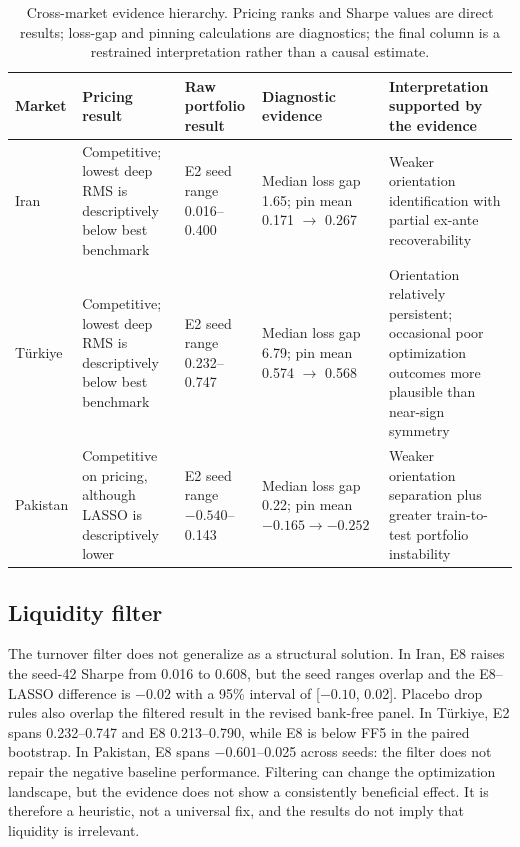\documentclass[12pt]{article}
\begin{document}
\begin{table}[htbp]
\centering
\caption{Cross-market evidence hierarchy. Pricing ranks and Sharpe values are direct results; loss-gap and pinning calculations are diagnostics; the final column is a restrained interpretation rather than a causal estimate.}
\label{tab:diagnosis}
\scriptsize
\setlength{\tabcolsep}{2pt}
\begin{tabular}{>{\raggedright\arraybackslash}p{1.4cm}>{\raggedright\arraybackslash}p{2.7cm}>{\raggedright\arraybackslash}p{2.3cm}>{\raggedright\arraybackslash}p{2.6cm}>{\raggedright\arraybackslash}p{4.1cm}}
\toprule
Market & Pricing result & Raw portfolio result & Diagnostic evidence & Interpretation supported by the evidence \\
\midrule
Iran & Competitive; lowest deep RMS is descriptively below best benchmark & E2 seed range 0.016--0.400 & Median loss gap 1.65; pin mean 0.171 $\rightarrow$ 0.267 & Weaker orientation identification with partial ex-ante recoverability \\
T\"urkiye & Competitive; lowest deep RMS is descriptively below best benchmark & E2 seed range 0.232--0.747 & Median loss gap 6.79; pin mean 0.574 $\rightarrow$ 0.568 & Orientation relatively persistent; occasional poor optimization outcomes more plausible than near-sign symmetry \\
Pakistan & Competitive on pricing, although LASSO is descriptively lower & E2 seed range $-0.540$--0.143 & Median loss gap 0.22; pin mean $-0.165\rightarrow-0.252$ & Weaker orientation separation plus greater train-to-test portfolio instability \\
\bottomrule
\end{tabular}
\end{table}

\subsection{Liquidity filter}

The turnover filter does not generalize as a structural solution. In Iran, E8 raises the seed-42 Sharpe from 0.016 to 0.608, but the seed ranges overlap and the E8--LASSO difference is $-0.02$ with a 95\% interval of [$-0.10$, 0.02]. Placebo drop rules also overlap the filtered result in the revised bank-free panel. In T\"urkiye, E2 spans 0.232--0.747 and E8 0.213--0.790, while E8 is below FF5 in the paired bootstrap. In Pakistan, E8 spans $-0.601$--0.025 across seeds: the filter does not repair the negative baseline performance. Filtering can change the optimization landscape, but the evidence does not show a consistently beneficial effect. It is therefore a heuristic, not a universal fix, and the results do not imply that liquidity is irrelevant.
\end{document}
